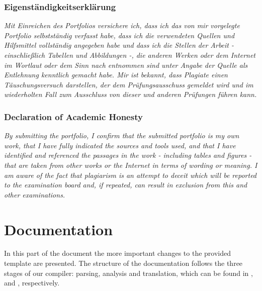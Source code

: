 \documentclass[]{tukportfolio}
\author{Marian Hristov}
\begin{document}

\maketitle

\section*{Eigenständigkeitserklärung}
\textit{Mit Einreichen des Portfolios versichere ich, dass ich das von mir vorgelegte Portfolio selbstständig verfasst habe, dass ich die verwendeten Quellen und Hilfsmittel vollständig angegeben habe und dass ich die Stellen der Arbeit - einschließlich Tabellen und Abbildungen -, die anderen Werken oder dem Internet im Wortlaut oder dem Sinn nach entnommen sind unter Angabe der Quelle als Entlehnung kenntlich gemacht habe.
Mir ist bekannt, dass Plagiate einen Täuschungsversuch darstellen, der dem Prüfungsausschuss gemeldet wird und im wiederholten Fall zum Ausschluss von dieser und anderen Prüfungen führen kann.} \\

\section*{Declaration of Academic Honesty}
\textit{By submitting the portfolio, I confirm that the submitted portfolio is my own work, that I have fully indicated the sources and tools used, and that I have identified and referenced the passages in the work - including tables and figures - that are taken from other works or the Internet in terms of wording or meaning.
I am aware of the fact that plagiarism is an attempt to deceit which will be reported to the examination board and, if repeated, can result in exclusion from this and other examinations.}

\newpage

\part*{Documentation}
In this part of the document the more important changes to the provided template are presented.
The structure of the documentation follows the three stages of our compiler: 
parsing, analysis and translation, which can be found in
,  and , respectively. 
\end{document}
